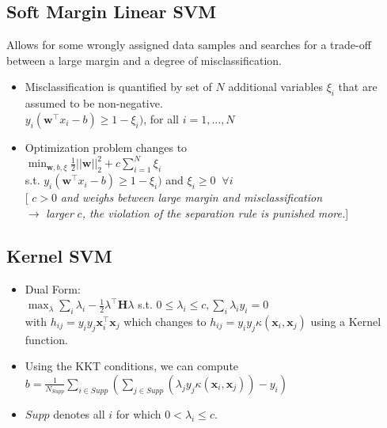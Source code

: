\documentclass[english]{latex4ei/latex4ei_sheet}
\begin{document}
\begin{sectionbox}
\subsection{Soft Margin Linear SVM}
Allows for some wrongly assigned data samples and searches for a trade-off between a large margin and a degree of misclassification.
\begin{itemize}
    \item Misclassification is quantified by set of $N$ additional variables $\xi_i$ that are assumed to be non-negative.\\
    $y_i(\mathbf{w}^{\top}x_i-b)\ge 1-\xi_i)$, for all $i=1,...,N$
    \item Optimization problem changes to\\
    $\min_{\mathbf{w},b,\xi}\frac{1}{2}||\mathbf{w}||_2^2+c\sum_{i=1}^N\xi_i$\\
    s.t. $y_i(\mathbf{w}^{\top}x_i-b)\ge 1-\xi_i)$ and $\xi_i\ge0\;\;\forall i$\\
    \hspace{5}[ $c>0$\emph{ and weighs between large margin and misclassification }\\$\rightarrow$\emph{ larger }$c$\emph{, the violation of the separation rule is punished more.}]
\end{itemize}
\end{sectionbox}

\begin{sectionbox}
\subsection{Kernel SVM}
\begin{itemize}
    \item Dual Form: \\$\max_{\lambda}\sum_i \lambda_i - \frac{1}{2}\lambda^{\top}\mathbf{H}\lambda$ s.t. $0\le\lambda_i\le c, \sum_i \lambda_i y_i=0$\\
with $h_{ij}=y_i y_j \mathbf{x}_i^{\top} \mathbf{x}_j$ which changes to $h_{ij}=y_i y_j \kappa(\mathbf{x}_i, \mathbf{x}_j)$ using a Kernel function.
\item Using the KKT conditions, we can compute\\$b=\frac{1}{N_{Supp}}\sum_{i\in Supp}(\sum_{j\in Supp}(\lambda_j y_j \kappa(\mathbf{x}_i,\mathbf{x}_j))-y_i)$
\item $Supp$ denotes all $i$ for which $0<\lambda_i\le c$.
\end{itemize}

\end{sectionbox}
\end{document}

